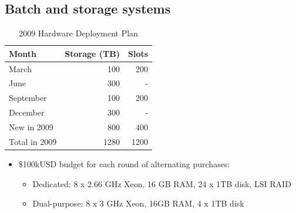 \documentclass{beamer}
\begin{document}
\subsection{Batch and storage systems}
\begin{frame}
\begin{table}
\begin{tabular}{lrr}
    \toprule
    Month           &   Storage (TB)    &   Slots \\
    \midrule
    March           &   100             &   200 \\
    June            &   300             &   - \\
    September       &   100             &   200 \\
    December        &   300             &   - \\
    \midrule
    New in 2009     &   800             &   400 \\
    Total in 2009   &   1280            &   1200 \\
    \bottomrule
\end{tabular}
\caption{2009 Hardware Deployment Plan}
\label{2009_hardware deployment_plan}
\end{table}

\begin{itemize}
    \item \$100kUSD budget for each round of alternating purchases:
    \begin{itemize}
        \item Dedicated: 8 x 2.66 GHz Xeon, 16 GB RAM, 24 x 1TB disk, LSI RAID
        \item Dual-purpose: 8 x 3 GHz Xeon, 16GB RAM, 4 x 1TB disk
    \end{itemize}
\end{itemize}

\end{frame}
\end{document}
